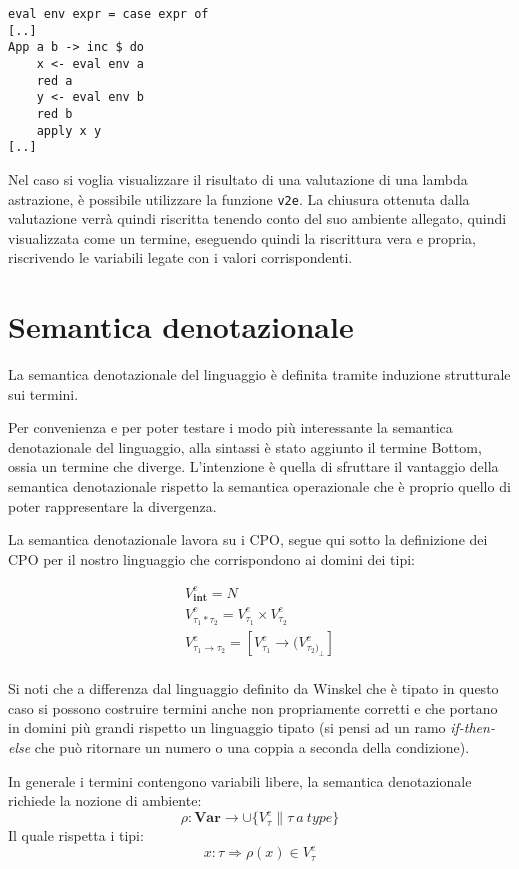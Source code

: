 \documentclass{article}
\begin{document}
\begin{verbatim}
eval env expr = case expr of
[..]
App a b -> inc $ do
    x <- eval env a
    red a
    y <- eval env b
    red b
    apply x y
[..]
\end{verbatim}

Nel caso si voglia visualizzare il risultato di una valutazione di una lambda astrazione, è possibile utilizzare la funzione  \texttt{v2e}. La chiusura ottenuta dalla valutazione verrà quindi riscritta tenendo conto del suo ambiente allegato, quindi visualizzata come un termine, eseguendo quindi la riscrittura vera e propria, riscrivendo le variabili legate con i valori corrispondenti.



\section{Semantica denotazionale}
\label{sec:denotational}
La semantica denotazionale del linguaggio è definita tramite induzione strutturale sui termini.

Per convenienza e per poter testare i modo più interessante la semantica denotazionale del linguaggio, alla sintassi è stato aggiunto il termine Bottom, ossia un termine che diverge. L'intenzione è quella di sfruttare il vantaggio della semantica denotazionale rispetto la semantica operazionale che è proprio quello di poter rappresentare la divergenza.

La semantica denotazionale lavora su i CPO, segue qui sotto la definizione dei CPO per il nostro linguaggio che corrispondono ai domini dei tipi:

\begin{gather*}
V^{e}_{\mathbf{int}} = N
\\
V^{e}_{\tau_{1} * \tau_{2}} = V^{e}_{\tau_{1}} \times V^{e}_{\tau_{2}}
\\
V^{e}_{\tau_{1} \rightarrow \tau_{2}} = [V^{e}_{\tau_{1}} \rightarrow (V^{e}_{\tau_{2})_{\perp}}]
\\
\end{gather*}

Si noti che a differenza dal linguaggio definito da Winskel che è tipato in questo caso si possono costruire termini anche non propriamente corretti e che portano in domini più grandi rispetto un linguaggio tipato (si pensi ad un ramo \emph{if-then-else} che può ritornare un numero o una coppia a seconda della condizione).

In generale i termini contengono variabili libere, la semantica denotazionale richiede la nozione di ambiente:
$$
\rho : \mathbf{Var} \rightarrow \cup \{ V^{e}_\tau \| \tau \ a \ type \}
$$
Il quale rispetta i tipi:
$$
x : \tau \Rightarrow \rho ( x ) \in V^{e}_{\tau}
$$
\end{document}
